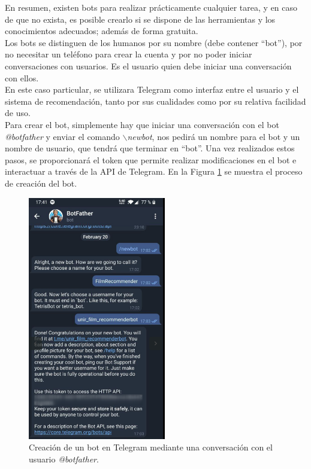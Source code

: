 En resumen, existen bots para realizar prácticamente cualquier tarea, y en caso de que no exista, es posible crearlo si se dispone de las herramientas y los conocimientos adecuados; además de forma gratuita.\\

Los bots se distinguen de los humanos por su nombre (debe contener ``bot''), por no necesitar un teléfono para crear la cuenta y por no poder iniciar conversaciones con usuarios. Es el usuario quien debe iniciar una conversación con ellos.\\

En este caso particular, se utilizara Telegram como interfaz entre el usuario y el sistema de recomendación, tanto por sus cualidades como por su relativa facilidad de uso.\\

Para crear el bot, simplemente hay que iniciar una conversación con el bot \textit{@botfather} y enviar el comando \textit{$\backslash$newbot}, nos pedirá un nombre para el bot y un nombre de usuario, que tendrá que terminar en ``bot''. Una vez realizados estos pasos, se proporcionará el token que permite realizar modificaciones en el bot e interactuar a través de la API de Telegram. En la Figura \ref{fig:botfather} se muestra el proceso de creación del bot.

\begin{figure}[H]
    \centering
    \captionsetup{width=8cm}
    \includegraphics[width=6cm]{contenido/imagenes/botfather.png}
    \caption{Creación de un bot en Telegram mediante una conversación con el usuario \textit{@botfather}.}
    \label{fig:botfather}
\end{figure}


